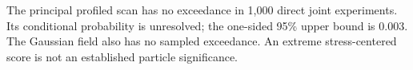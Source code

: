 The principal profiled scan has no exceedance in 1,000 direct joint experiments. Its conditional probability is unresolved; the one-sided 95\% upper bound is 0.003. The Gaussian field also has no sampled exceedance. An extreme stress-centered score is not an established particle significance.
